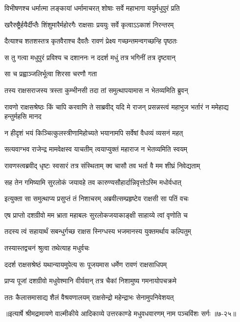 \twolineshloka
{विभीषणश्च धर्मात्मा लङ्कायां धर्मामाचरत्}
{शोषाः सर्वे महाभागा ययुर्मधुपुरं प्रति} %

\twolineshloka
{खरैरुष्ट्रैर्हयैर्दीप्तैः शिंशुमारैर्महोरगैः}
{राक्षसाः प्रययुः सर्वे कृत्वाऽऽकाशं निरन्तरम्} %

\twolineshloka
{दैत्याश्च शतशस्तत्र कृतवैराश्च दैवतैः}
{रावणं प्रेक्ष्य गच्छन्तमन्वगच्छन्हि पृष्ठतः} %

\twolineshloka
{स तु गत्वा मधुपुरं प्रविश्य च दशाननः}
{न ददर्श मधुं तत्र भगिनीं तत्र दृष्टवान्} %

\onelineshloka
{सा च प्रह्वाञ्जलिर्भूत्वा शिरसा चरणौ गता} %

\twolineshloka
{तस्य राक्षसराजस्य त्रस्ता कुम्भीनसी तदा}
{तां समुत्थापयामास न भेतव्यमिति ब्रुवन्} %

\threelineshloka
{रावणो राक्षसश्रेष्ठः किं चापि करवाणि ते}
{साब्रवीद् यदि मे राजन् प्रसन्नस्त्वं महाभुज}
{भर्तारं न ममेहाद्य हन्तुर्महसि मानद} %

\twolineshloka
{न हीदृशं भयं किञ्चित्कुलस्त्रीणामिहोच्यते}
{भयानामपि सर्वेषां वैधव्यं व्यसनं महत्} %

\twolineshloka
{सत्यवाग्भव राजेन्द्र मामवेक्षस्व याचतीम्}
{त्वयाप्युक्तं महाराज न भेतव्यमिति स्वयम्} %

\twolineshloka
{रावणस्त्वब्रवीद् धृष्टः स्वसारं तत्र संस्थिताम्}
{क्व चासौ तव भर्ता वै मम शीघ्रं निवेद्यताम्} %

\twolineshloka
{सह तेन गमिष्यामि सुरलोकं जयावहे}
{तव कारुण्यसौहार्दान्निवृत्तोऽस्मि मधोर्वधात्} %

\twolineshloka
{इत्युक्ता सा समुत्थाप्य प्रसुप्तं तं निशाचरम्}
{अब्रवीत्सम्प्रहृष्टेव राक्षसी सा पतिं वचः} %

\twolineshloka
{एष प्राप्तो दशग्रीवो मम भ्राता महाबलः}
{सुरलोकजयाकाङ्क्षी साहाय्ये त्वां वृणोति च} %

\twolineshloka
{तदस्य त्वं सहायार्थं सबन्धुर्गच्छ राक्षस}
{स्निग्धस्य भजमानस्य युक्तमर्थाय कल्पितुम्} %

\onelineshloka
{तस्यास्तद्वचनं श्रुत्वा तथेत्याह मधुर्वचः} %

\twolineshloka
{ददर्श राक्षसश्रेष्ठं यथान्यायमुपेत्य सः}
{पूजयमास धर्मेण रावणं राक्षसाधिपम्} %

\twolineshloka
{प्राप्य पूजां दशग्रीवो मधुवेश्मानि वीर्यवान्}
{तत्र चैकां निशामुष्य गमनायोपचक्रमे} %

\twolineshloka
{ततः कैलासमासाद्य शैलं वैश्रवणालयम्}
{राक्षसेन्द्रो महेन्द्राभः सेनामुपनिवेशयत्} %


॥इत्यार्षे श्रीमद्रामायणे वाल्मीकीये आदिकाव्ये उत्तरकाण्डे मधुवधवारणम् नाम पञ्चविंशः सर्गः ॥७-२५॥
